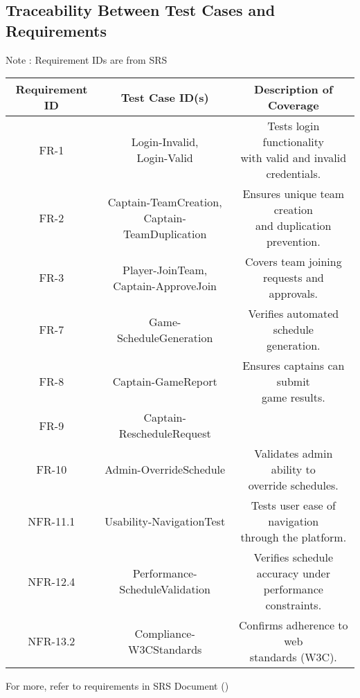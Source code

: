 \documentclass[12pt, titlepage]{article}
\begin{document}
\subsection{Traceability Between Test Cases and Requirements}
Note : Requirement IDs are from SRS
\begin{center}
    \begin{tabular}{ |c|c|c| }
		\hline
		\textbf{Requirement ID } & \textbf{Test Case ID(s)} & \textbf{Description of Coverage} \\ \hline
		FR-1 & \makecell{Login-Invalid, \\ Login-Valid} & \makecell{Tests login functionality \\ with valid and invalid credentials.} \\ \hline
		FR-2 & \makecell{Captain-TeamCreation, \\ Captain-TeamDuplication} & \makecell{Ensures unique team creation \\ and duplication prevention.} \\ \hline
		FR-3 & \makecell{Player-JoinTeam, \\ Captain-ApproveJoin} & \makecell{Covers team joining requests and\\ approvals.} \\ \hline
		FR-7 & Game-ScheduleGeneration & \makecell{Verifies automated schedule\\ generation.} \\ \hline
		FR-8 & Captain-GameReport & \makecell{Ensures captains can submit\\ game results.} \\ \hline
		FR-9 & Captain-RescheduleRequest & \makecell{Verifies rescheduling requests.} \\ \hline
		FR-10 & Admin-OverrideSchedule & \makecell{Validates admin ability to\\ override schedules.} \\ \hline
		NFR-11.1 & Usability-NavigationTest & \makecell{Tests user ease of navigation\\ through the platform.} \\ \hline
		NFR-12.4 & Performance-ScheduleValidation & \makecell{Verifies schedule accuracy under\\ performance constraints.} \\ \hline
		NFR-13.2 & Compliance-W3CStandards & \makecell{Confirms adherence to web\\ standards (W3C).} \\ \hline
	\end{tabular}
\end{center}
For more, refer to requirements in SRS Document () 
\end{document}
